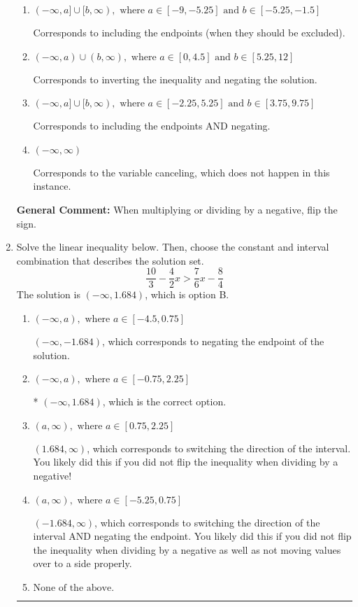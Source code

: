 \documentclass{extbook}[14pt]
\newcommand{\litem}[1]{\item #1

\rule{\textwidth}{0.4pt}}
\begin{document}
\begin{enumerate}
{\begin{enumerate}[label=\Alph*.]
 * Correct option.
\item \( (-\infty, a] \cup [b, \infty), \text{ where } a \in [-9, -5.25] \text{ and } b \in [-5.25, -1.5] \)

Corresponds to including the endpoints (when they should be excluded).
\item \( (-\infty, a) \cup (b, \infty), \text{ where } a \in [0, 4.5] \text{ and } b \in [5.25, 12] \)

Corresponds to inverting the inequality and negating the solution.
\item \( (-\infty, a] \cup [b, \infty), \text{ where } a \in [-2.25, 5.25] \text{ and } b \in [3.75, 9.75] \)

Corresponds to including the endpoints AND negating.
\item \( (-\infty, \infty) \)

Corresponds to the variable canceling, which does not happen in this instance.
\end{enumerate}

\textbf{General Comment:} When multiplying or dividing by a negative, flip the sign.
}
\litem{
Solve the linear inequality below. Then, choose the constant and interval combination that describes the solution set.
\[ \frac{10}{3} - \frac{4}{2} x > \frac{7}{6} x - \frac{8}{4} \]The solution is \( (-\infty, 1.684) \), which is option B.\begin{enumerate}[label=\Alph*.]
\item \( (-\infty, a), \text{ where } a \in [-4.5, 0.75] \)

 $(-\infty, -1.684)$, which corresponds to negating the endpoint of the solution.
\item \( (-\infty, a), \text{ where } a \in [-0.75, 2.25] \)

* $(-\infty, 1.684)$, which is the correct option.
\item \( (a, \infty), \text{ where } a \in [0.75, 2.25] \)

 $(1.684, \infty)$, which corresponds to switching the direction of the interval. You likely did this if you did not flip the inequality when dividing by a negative!
\item \( (a, \infty), \text{ where } a \in [-5.25, 0.75] \)

 $(-1.684, \infty)$, which corresponds to switching the direction of the interval AND negating the endpoint. You likely did this if you did not flip the inequality when dividing by a negative as well as not moving values over to a side properly.
\item \( \text{None of the above}. \)


\end{enumerate}}
\end{enumerate}
\end{document}
